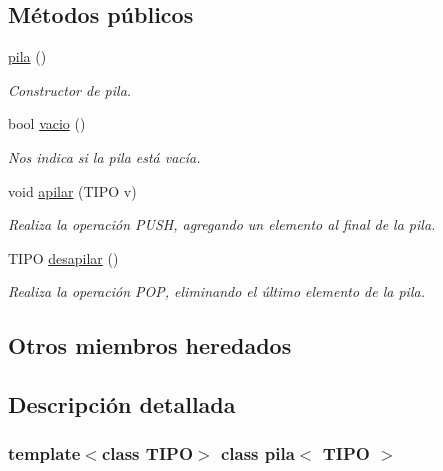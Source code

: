 \subsection*{Métodos públicos}
\begin{DoxyCompactItemize}
\item 
\mbox{\label{classpila_ade9134db35fdc8ab820f087b7bf9a4c8}} 
\hyperlink{classpila_ade9134db35fdc8ab820f087b7bf9a4c8}{pila} ()
\begin{DoxyCompactList}\small\item\em Constructor de pila. \end{DoxyCompactList}\item 
\mbox{\label{classpila_a1c4a98c4932e4b2f7c174921c2443e8a}} 
bool \hyperlink{classpila_a1c4a98c4932e4b2f7c174921c2443e8a}{vacio} ()
\begin{DoxyCompactList}\small\item\em Nos indica si la pila está vacía. \end{DoxyCompactList}\item 
void \hyperlink{classpila_aadc65c1c0f7d355204aa80d0ca10b688}{apilar} (T\+I\+PO v)
\begin{DoxyCompactList}\small\item\em Realiza la operación P\+U\+SH, agregando un elemento al final de la pila. \end{DoxyCompactList}\item 
\mbox{\label{classpila_a6024dd235a660c7806e47a36194b97cc}} 
T\+I\+PO \hyperlink{classpila_a6024dd235a660c7806e47a36194b97cc}{desapilar} ()
\begin{DoxyCompactList}\small\item\em Realiza la operación P\+OP, eliminando el último elemento de la pila. \end{DoxyCompactList}\end{DoxyCompactItemize}
\subsection*{Otros miembros heredados}


\subsection{Descripción detallada}
\subsubsection*{template$<$class T\+I\+PO$>$\newline
class pila$<$ T\+I\+P\+O $>$}

